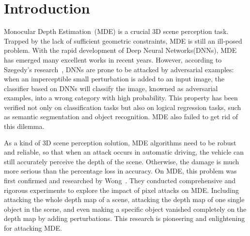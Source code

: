 \documentclass[10pt,twocolumn,letterpaper]{article}
\begin{document}
\section{Introduction}
Monocular Depth Estimation~(MDE) 
is a crucial 3D scene perception task. 
Trapped by the lack of sufficient geometric constraints, 
MDE is still an ill-posed problem. With the rapid development of 
Deep Neural Networks(DNNs), MDE has emerged many excellent works 
in recent years. However, according to Szegedy's 
research~\cite{Szegedy_2014_ICLR}, DNNs are 
prone to be attacked by adversarial examples: 
when an imperceptible 
small perturbation is added to an input image, the classifier 
based on DNNs will classify the image, knowned as
adversarial examples, into a wrong category with high probability. 
This property has been verified not only on classification tasks 
but also on logical regression tasks, such as 
semantic segmentation and 
object recognition. MDE also failed to get rid of this dilemma.

As a kind of 3D scene perception solution, MDE 
algorithms need to be 
robust and reliable, so that when an attack occurs in automatic 
driving, the vehicle can still accurately perceive the depth 
of the scene. Otherwise, the damage is much more serious than 
the percentage loss in accuracy. On MDE, this problem was 
first confirmed and researched by Wong~\cite{Wong_2020_NIPS}. 
They conducted 
comprehensive and rigorous experiments to explore the impact 
of pixel attacks on MDE. Including attacking the whole 
depth map of a scene, attacking the depth map of one 
single object in the scene, and even making a specific 
object vanished completely on the depth map by 
adding perturbations. This research is pioneering and 
enlightening for attacking MDE.
\end{document}
